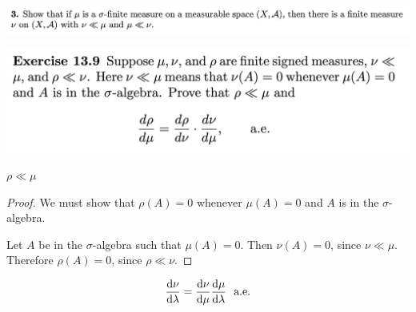 \begin{mdframed}
\includegraphics[width=400pt]{img/analysis--berkeley-202a-hw11-3704.png}
\end{mdframed}


\begin{mdframed}
\includegraphics[width=400pt]{img/analysis--berkeley-202a-hw11-f2c0.png}
\end{mdframed}


\begin{claim*}
  $\rho \ll \mu$
\end{claim*}
\begin{proof}
  We must show that $\rho(A) = 0$ whenever $\mu(A) = 0$ and $A$ is in the $\sigma$-algebra.

  Let $A$ be in the $\sigma$-algebra such that $\mu(A) = 0$. Then $\nu(A) = 0$, since $\nu \ll \mu$.
  Therefore $\rho(A) = 0$, since $\rho \ll \nu$.
\end{proof}

\begin{claim*}
  \begin{align*}
    \frac{\d\nu}{\d\lambda} = \frac{\d\nu}{\d\mu}\frac{\d\mu}{\d\lambda} \ae
  \end{align*}
\end{claim*}

